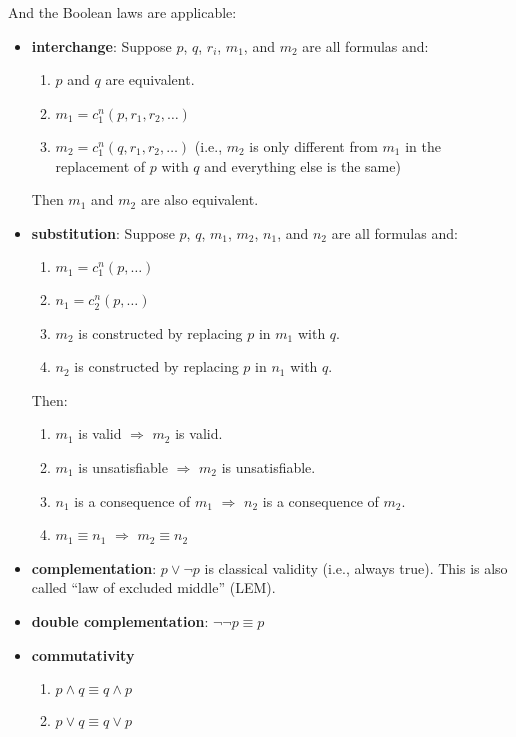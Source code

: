\documentclass[12pt, letterpaper]{article}
\begin{document}
And the Boolean laws are applicable:
\begin{itemize}
  \item \textbf{interchange}: Suppose $p$, $q$, $r_i$, $m_1$, and $m_2$ are all
    formulas and:
    \begin{enumerate}
      \item $p$ and $q$ are equivalent.
      \item $m_1 = c_1^n(p, r_1, r_2, \ldots)$
      \item $m_2 = c_1^n(q, r_1, r_2, \ldots)$ (i.e., $m_2$ is only different
        from $m_1$ in the replacement of $p$ with $q$ and everything else is
        the same)
    \end{enumerate}
    Then $m_1$ and $m_2$ are also equivalent.
  \item \textbf{substitution}: Suppose $p$, $q$, $m_1$, $m_2$, $n_1$, and $n_2$
    are all formulas and:
    \begin{enumerate}
      \item $m_1 = c_1^n(p, \ldots)$
      \item $n_1 = c_2^n(p, \ldots)$
      \item $m_2$ is constructed by replacing $p$ in $m_1$ with $q$.
      \item $n_2$ is constructed by replacing $p$ in $n_1$ with $q$.
    \end{enumerate}
    Then:
    \begin{enumerate}
      \item $m_1$ is valid $\Rightarrow$ $m_2$ is valid.
      \item $m_1$ is unsatisfiable $\Rightarrow$ $m_2$ is unsatisfiable.
      \item $n_1$ is a consequence of $m_1$ $\Rightarrow$ $n_2$ is a consequence
        of $m_2$.
      \item $m_1 \equiv n_1$ $\Rightarrow$ $m_2 \equiv n_2$
    \end{enumerate}
  \item \textbf{complementation}: $p \lor \lnot p$ is classical validity (i.e.,
    always true). This is also called ``law of excluded middle'' (LEM).
  \item \textbf{double complementation}: $\lnot \lnot p \equiv p$
  \item \textbf{commutativity}
    \begin{enumerate}
      \item $p \land q \equiv q \land p$
      \item $p \lor q \equiv q \lor p$
    \end{enumerate}

\end{itemize}
\end{document}

